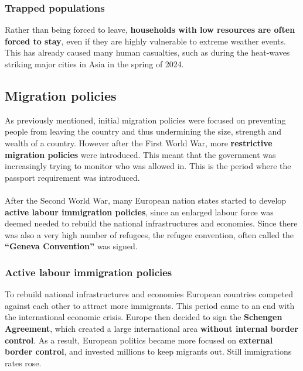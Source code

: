 \documentclass[../summary.tex]{subfiles}
\begin{document}
	\subsubsection{Trapped populations}
	Rather than being forced to leave, \textbf{households with low resources are often forced to stay}, even if they are highly vulnerable to extreme weather events. This has already caused many human casualties, such as during the heat-waves striking major cities in Asia in the spring of 2024. 
	
	\subsection{Migration policies}
	As previously mentioned, initial migration policies were focused on preventing people from leaving the country and thus undermining the size, strength and wealth of a country. However after the First World War, more \textbf{restrictive migration policies} were introduced. This meant that the government was increasingly trying to monitor who was allowed in. This is the period where the passport requirement was introduced. 
	\\\\
	After the Second World War, many European nation states started to develop \textbf{active labour immigration policies}, since an enlarged labour force was deemed needed to rebuild the national infrastructures and economies. Since there was also a very high number of refugees, the refugee convention, often called the \textbf{``Geneva Convention''} was signed.
	
	\newpage
	
	\subsubsection{Active labour immigration policies}
 	To rebuild national infrastructures and economies European countries competed against each other to attract more immigrants. This period came to an end with the international economic crisis. Europe then decided to sign the \textbf{Schengen Agreement}, which created a large international area \textbf{without internal border control}. As a result, European politics became more focused on \textbf{external border control}, and invested millions to keep migrants out. Still immigrations rates rose. 
 	
\end{document}
